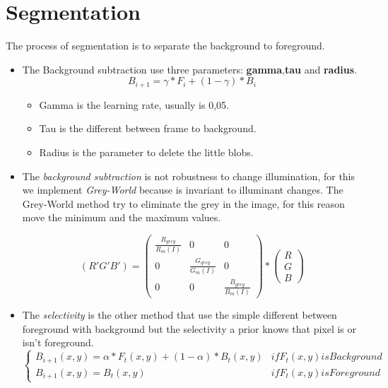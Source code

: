 \section{Segmentation}
The process of segmentation is to separate the background to foreground.

\begin{itemize}
\item The Background subtraction use three parameters: \textbf{gamma},\textbf{tau} and \textbf{radius}.
	\begin{equation} B_{i+1} = \gamma * F_{i} + (1-\gamma)*B_{i} \end{equation}
	\begin{itemize}
	\item Gamma is the learning rate, usually is 0,05.
	\item Tau is the different between frame to background.
	\item Radius is the parameter to delete the little blobs.
	\end{itemize}
	
\item The \textit{background subtraction} is not robustness to change illumination, for this we implement \textit{Grey-World} because is invariant to illuminant changes. 
The Grey-World method try to eliminate the grey in the image, for this reason move the minimum and the maximum values.

\begin{equation}
	( R' G' B' )= \left(
	\begin{array}{cccl}
		\frac{R_{grey}}{R_{m}(I)} & 0 & 0 \\
		0 & \frac{G_{grey}}{G_{m}(I)} & 0 \\
 		0 & 0 & \frac{B_{grey}}{B_{m}(I)}
	\end{array}
	\right) 
	* 
	\left(
	\begin{array}{c} R \\ G \\ B
	\end{array}
	\right)
\end{equation} 

\item The \textit{selectivity} is the other method that use the simple different between foreground with background but the selectivity a prior knows that pixel is or isn't foreground. 
	\begin{equation}
	\left \{
	\begin{array}{cccl}
		B_{i+1}(x,y) = \alpha * F_{t}(x,y)+(1-\alpha )* B_{t}(x,y) & if F_{t}(x,y) is Background \\
		B_{i+1}(x,y) = B_{t}(x,y) & if F_{t}(x,y) is Foreground
	\end{array} \right.
	\end{equation}



\end{itemize}
